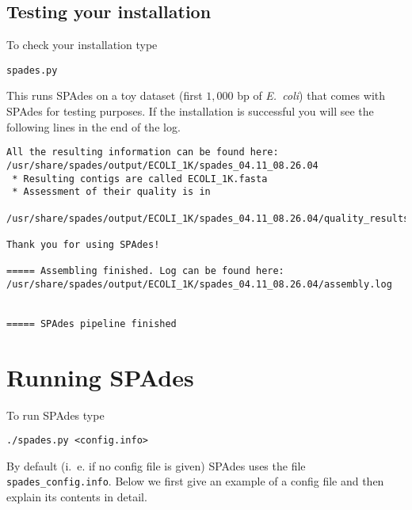 \documentclass{article}
\def\spades{SPAdes}
\def\ecoli{\it E.~coli}
\begin{document}
\subsection{Testing your installation}
To check your installation type
\begin{lstlisting}
spades.py
\end{lstlisting}
This runs {\spades} on a toy dataset (first $1{,}000$ bp of {\ecoli}) that comes with {\spades} for testing purposes.
If the installation is successful you will see the following lines in the end of the log.
\begin{lstlisting}
All the resulting information can be found here:
/usr/share/spades/output/ECOLI_1K/spades_04.11_08.26.04
 * Resulting contigs are called ECOLI_1K.fasta
 * Assessment of their quality is in
  /usr/share/spades/output/ECOLI_1K/spades_04.11_08.26.04/quality_results/

Thank you for using SPAdes!

===== Assembling finished. Log can be found here:
/usr/share/spades/output/ECOLI_1K/spades_04.11_08.26.04/assembly.log


===== SPAdes pipeline finished
\end{lstlisting}



\section{Running {\spades}}\label{sec:running}
To run {\spades} type
\begin{lstlisting}
./spades.py <config.info>
\end{lstlisting}
By default (i.~e. if no config file is given) {\spades} uses the file {\tt spades\_config.info}. 
Below we first give an example of a config file
and then explain its contents in detail.
\end{document}
